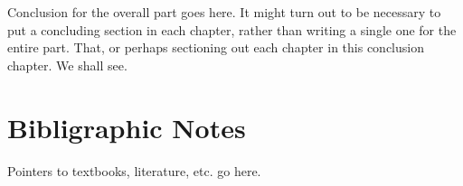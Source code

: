 \label{background:conclusion}
Conclusion for the overall part goes here. It might turn out to be necessary to put a concluding section in each chapter, rather than writing a single one for the entire part. That, or perhaps sectioning out each chapter in this conclusion chapter. We shall see.

\section{Bibligraphic Notes}
Pointers to textbooks, literature, etc. go here.
